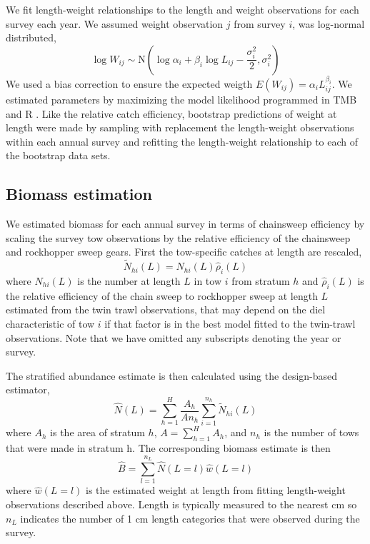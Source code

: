 \documentclass[]{article}
\begin{document}
We fit length-weight relationships to the length and weight observations
for each survey each year. We assumed weight observation \(j\) from
survey \(i\), was log-normal distributed, \begin{equation}\label{wal}
 \log W_{ij} \sim \text{N}\left(\log \alpha_i + \beta_i \log L_{ij} - \frac{\sigma_i^2}{2}, \sigma_i^2\right)
\end{equation} We used a bias correction to ensure the expected weigth
\(E(W_{ij})= \alpha_i L_{ij}^{\beta_i}\). We estimated parameters by
maximizing the model likelihood programmed in TMB
\citep{kristensenetal16} and R \citep{R19}. Like the relative catch
efficiency, bootstrap predictions of weight at length were made by
sampling with replacement the length-weight observations within each
annual survey and refitting the length-weight relationship to each of
the bootstrap data sets.

\hypertarget{biomass-estimation}{%
\subsection{Biomass estimation}\label{biomass-estimation}}

We estimated biomass for each annual survey in terms of chainsweep
efficiency by scaling the survey tow observations by the relative
efficiency of the chainsweep and rockhopper sweep gears. First the
tow-specific catches at length are rescaled, \begin{equation}\label{nal}
\widetilde N_{hi}\left(L\right) = N_{hi}\left(L\right)\widehat \rho_i\left(L\right)
\end{equation} where \(N_{hi}(L)\) is the number at length \(L\) in tow
\(i\) from stratum \(h\) and \(\widehat \rho_i\left(L\right)\) is the
relative efficiency of the chain sweep to rockhopper sweep at length
\(L\) estimated from the twin trawl observations, that may depend on the
diel characteristic of tow \(i\) if that factor is in the best model
fitted to the twin-trawl observations. Note that we have omitted any
subscripts denoting the year or survey.

The stratified abundance estimate is then calculated using the
design-based estimator, \begin{equation}\label{Nal_estimate}
 \widehat N(L) = \sum^H_{h=1} \frac{A_h}{An_h}\sum^{n_h}_{i=1} \widetilde N_{hi}(L)
\end{equation} where \(A_h\) is the area of stratum \(h\),
\(A=\sum^H_{h=1} A_h\), and \(n_h\) is the number of tows that were made
in stratum h. The corresponding biomass estimate is then
\begin{equation}\label{biomass_estimate}
 \widehat B = \sum^{n_L}_{l=1} \widehat N(L = l) \widehat w(L=l)
\end{equation} where \(\widehat w(L=l)\) is the estimated weight at
length from fitting length-weight observations described above. Length
is typically measured to the nearest cm so \(n_L\) indicates the number
of 1 cm length categories that were observed during the survey.
\end{document}

